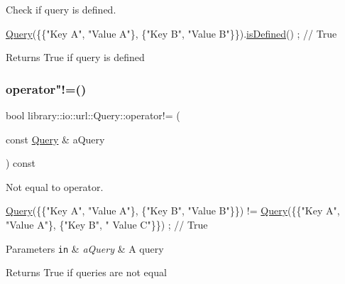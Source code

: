 Check if query is defined. 


\begin{DoxyCode}
\hyperlink{classlibrary_1_1io_1_1url_1_1_query_a6781de8f7b7251f8e17c191434b08039}{Query}(\{\{\textcolor{stringliteral}{"Key A"}, \textcolor{stringliteral}{"Value A"}\}, \{\textcolor{stringliteral}{"Key B"}, \textcolor{stringliteral}{"Value B"}\}\}).\hyperlink{classlibrary_1_1io_1_1url_1_1_query_a2f7f9b16e407735269d8e97f12ef9a8b}{isDefined}() ; \textcolor{comment}{// True}
\end{DoxyCode}


\begin{DoxyReturn}{Returns}
True if query is defined 
\end{DoxyReturn}
\mbox{\label{classlibrary_1_1io_1_1url_1_1_query_a9dbb8fd3e8063c752db6fdd62673eac3}} 
\subsubsection{\texorpdfstring{operator"!=()}{operator!=()}}
{\footnotesize\ttfamily bool library\+::io\+::url\+::\+Query\+::operator!= (\begin{DoxyParamCaption}\item[{const \hyperlink{classlibrary_1_1io_1_1url_1_1_query}{Query} \&}]{a\+Query }\end{DoxyParamCaption}) const}



Not equal to operator. 


\begin{DoxyCode}
\hyperlink{classlibrary_1_1io_1_1url_1_1_query_a6781de8f7b7251f8e17c191434b08039}{Query}(\{\{\textcolor{stringliteral}{"Key A"}, \textcolor{stringliteral}{"Value A"}\}, \{\textcolor{stringliteral}{"Key B"}, \textcolor{stringliteral}{"Value B"}\}\}) != \hyperlink{classlibrary_1_1io_1_1url_1_1_query_a6781de8f7b7251f8e17c191434b08039}{Query}(\{\{\textcolor{stringliteral}{"Key A"}, \textcolor{stringliteral}{"Value A"}\}, \{\textcolor{stringliteral}{"Key B"}, \textcolor{stringliteral}{"
      Value C"}\}\}) ; \textcolor{comment}{// True}
\end{DoxyCode}



\begin{DoxyParams}[1]{Parameters}
\mbox{\tt in}  & {\em a\+Query} & A query \\
\hline
\end{DoxyParams}
\begin{DoxyReturn}{Returns}
True if queries are not equal 
\end{DoxyReturn}
\mbox{\label{classlibrary_1_1io_1_1url_1_1_query_a7aa536f75df48e4ff7be3369d7f314ec}} 
